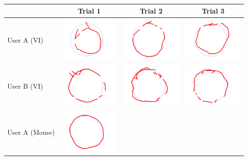 \begin{tabular}{lccc}
\toprule
 & Trial 1 & Trial 2 & Trial 3\\
\midrule
 User A (VI)&
\includegraphics[width=3cm]{fig_exp/circle_Ayaka_test3_0.png} &
\includegraphics[width=3cm]{fig_exp/circle_Ayaka_test3_1.png} &
\includegraphics[width=3cm]{fig_exp/circle_Ayaka_test3_2.png} \\
\midrule
 User B (VI)&
\includegraphics[width=3cm]{fig_exp/circle_Angus_test3_0.png} &
\includegraphics[width=3cm]{fig_exp/circle_Angus_test3_1.png} &
\includegraphics[width=3cm]{fig_exp/circle_Angus_test3_2.png} \\
\midrule
 User A (Mouse)&
\includegraphics[width=3cm]{fig_exp/circle_Ayaka_test3_0_m.png} &

\end{tabular}
